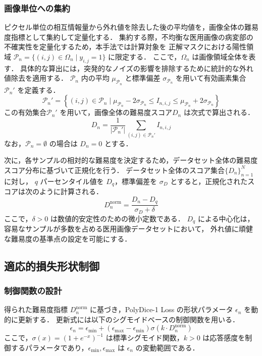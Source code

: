\documentclass[a4paper,platex,dvipdfmx,twocolumn]{jsarticle}
\begin{document}
\subsubsection{画像単位への集約}
ピクセル単位の相互情報量から外れ値を除去した後の平均値を，画像全体の難易度指標として集約して定量化する．
集約する際，不均衡な医用画像の病変部の不確実性を定量化するため，本手法では計算対象を
正解マスクにおける陽性領域 $\mathcal{P}_n = \{(i,j) \in \Omega_n \mid y_{i,j} = 1\}$ に限定する．
ここで，$\Omega_n$ は画像領域全体を表す．
具体的な算出には，突発的なノイズの影響を排除するために統計的な外れ値除去を適用する．
$\mathcal{P}_n$ 内の平均 $\mu_{\mathcal{P}_n}$ と標準偏差 $\sigma_{\mathcal{P}_n}$ を用いて有効画素集合 $\mathcal{P}_n'$ を定義する．
\begin{equation}
    \mathcal{P}_n' = \left\{(i,j) \in \mathcal{P}_n \mid \mu_{\mathcal{P}_n} - 2\sigma_{\mathcal{P}_n} \leq I_{n, i, j} \leq \mu_{\mathcal{P}_n} + 2\sigma_{\mathcal{P}_n} \right\}
\end{equation}
この有効集合$\mathcal{P}_n'$ を用いて，画像全体の難易度スコア$D_n$ は次式で算出される．
\begin{equation}
    D_n = \frac{1}{|\mathcal{P}_n'|} \sum_{(i,j) \in \mathcal{P}_n'} I_{n, i,j}
\end{equation}
なお，$\mathcal{P}_n = \emptyset$ の場合は $D_n = 0$ とする．

次に，各サンプルの相対的な難易度を決定するため，データセット全体の難易度スコア分布に基づいて正規化を行う．
データセット全体のスコア集合$\{D_n\}_{n = 1} ^ N$に対し， $q$ パーセンタイル値を $D_q$，標準偏差を $\sigma_D$ とすると，正規化されたスコアは次のように計算される．
\begin{equation}
    D ^ {\text{norm}}_{n} = \frac{D_n - D_{q}}{\sigma_D + \delta}
\end{equation}
ここで，$\delta > 0$ は数値的安定性のための微小定数である．
$D_q$ による中心化は，容易なサンプルが多数を占める医用画像データセットにおいて，
外れ値に頑健な難易度の基準点の設定を可能にする．
\subsection{適応的損失形状制御}

\subsubsection{制御関数の設計}
得られた難易度指標 $D ^ {\text{norm}}_{n}$ に基づき，PolyDice-1 Loss の形状パラメータ $\epsilon_n$ を動的に更新する．
更新式には以下のシグモイドベースの制御関数を用いる．
\begin{equation}
    \epsilon_n = \epsilon_{\text{min}} + (\epsilon_{\text{max}} - \epsilon_{\text{min}}) \sigma(k \cdot D ^ {\text{norm}}_{n})
\end{equation}
ここで，$\sigma(x) = (1 + e^{-x})^{-1}$ は標準シグモイド関数，$k > 0$ は応答感度を制御するパラメータであり，$\epsilon_{\text{min}}, \epsilon_{\text{max}}$ は $\epsilon_n$ の変動範囲である．
\end{document}
